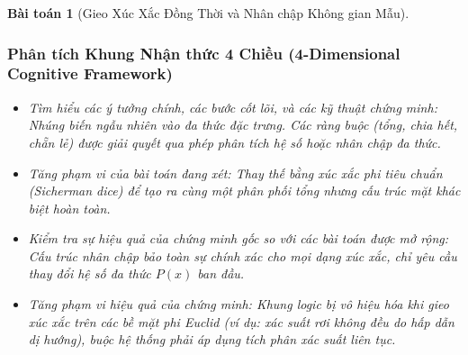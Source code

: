 \documentclass{article}
\newtheorem{baitoan}{Bài toán}
\begin{document}
\begin{baitoan}[Gieo Xúc Xắc Đồng Thời và Nhân chập Không gian Mẫu]
 \subsubsection*{Phân tích Khung Nhận thức 4 Chiều (4-Dimensional Cognitive Framework)}
 \begin{itemize}
 \item \textit{Tìm hiểu các ý tưởng chính, các bước cốt lõi, và các kỹ thuật chứng minh}: Nhúng biến ngẫu nhiên vào đa thức đặc trưng. Các ràng buộc (tổng, chia hết, chẵn lẻ) được giải quyết qua phép phân tích hệ số hoặc nhân chập đa thức.
 \item \textit{Tăng phạm vi của bài toán đang xét}: Thay thế bằng xúc xắc phi tiêu chuẩn (Sicherman dice) để tạo ra cùng một phân phối tổng nhưng cấu trúc mặt khác biệt hoàn toàn.
 
  \item \textit{Kiểm tra sự hiệu quả của chứng minh gốc so với các bài toán được mở rộng}: Cấu trúc nhân chập bảo toàn sự chính xác cho mọi dạng xúc xắc, chỉ yêu cầu thay đổi hệ số đa thức $P(x)$ ban đầu.
 \item \textit{Tăng phạm vi hiệu quả của chứng minh}: Khung logic bị vô hiệu hóa khi gieo xúc xắc trên các bề mặt phi Euclid (ví dụ: xác suất rơi không đều do hấp dẫn dị hướng), buộc hệ thống phải áp dụng tích phân xác suất liên tục.
 \end{itemize}
\end{baitoan}

\end{document}
